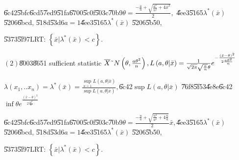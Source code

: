 \documentclass{article}
\begin{document}
\U{6c42}\U{5bfc}\U{6cd5}\U{7ed9}\U{51fa}\U{6700}\U{5c0f}\U{503c}\U{70b9}$%
\theta =\frac{-\frac{a}{n}+\sqrt{\frac{a^{2}}{n^{2}}+4\bar{x}^{2}}}{2},$%
\U{4ee3}\U{5165}$\lambda ^{\ast }\left( \bar{x}\right) $\U{5206}\U{6bcd},%
\U{518d}\U{53d6}$a=1$\U{4ee3}\U{5165}$\lambda ^{\ast }\left( \bar{x}\right) $%
\U{5206}\U{5b50},

\U{5373}\U{5f97}LRT: $\left\{ \bar{x}|\lambda ^{\ast }\left( \bar{x}\right)
<c\right\} .$

$\left( 2\right) $\U{8003}\U{8651} sufficient statistic $\overline{X}\symbol{%
126}N\left( \theta ,\frac{a\theta ^{2}}{n}\right) ,L\left( a,\theta |\bar{x}%
\right) =\frac{1}{\sqrt{2\pi }\sqrt{\frac{a}{n}}\theta }e^{-\frac{\left( 
\bar{x}-\theta \right) ^{2}}{2\frac{a\theta ^{2}}{n}}}$

$\lambda \left( x_{1},..x_{n}\right) =\lambda ^{\ast }\left( \bar{x}\right) =%
\frac{\underset{a=1}{\sup }L\left( a,\theta |\bar{x}\right) }{\sup L\left(
a,\theta |\bar{x}\right) },$\U{6c42}$\sup L\left( a,\theta |\bar{x}\right) $%
\U{76f8}\U{5f53}\U{4e8e}\U{6c42}$\inf \theta e^{\frac{\left( \bar{x}-\theta
\right) ^{2}}{2\frac{a\theta ^{2}}{n}}}$

\U{6c42}\U{5bfc}\U{6cd5}\U{7ed9}\U{51fa}\U{6700}\U{5c0f}\U{503c}\U{70b9}$%
\theta =\frac{-\frac{n}{a}+\sqrt{\frac{n^{2}}{a^{2}}+4\frac{n}{a}}}{2}\bar{x}%
,$\U{4ee3}\U{5165}$\lambda ^{\ast }\left( \bar{x}\right) $\U{5206}\U{6bcd},%
\U{518d}\U{53d6}$a=1$\U{4ee3}\U{5165}$\lambda ^{\ast }\left( \bar{x}\right) $%
\U{5206}\U{5b50},

\U{5373}\U{5f97}LRT: $\left\{ \bar{x}|\lambda ^{\ast }\left( \bar{x}\right)
<c\right\} .$
\end{document}

